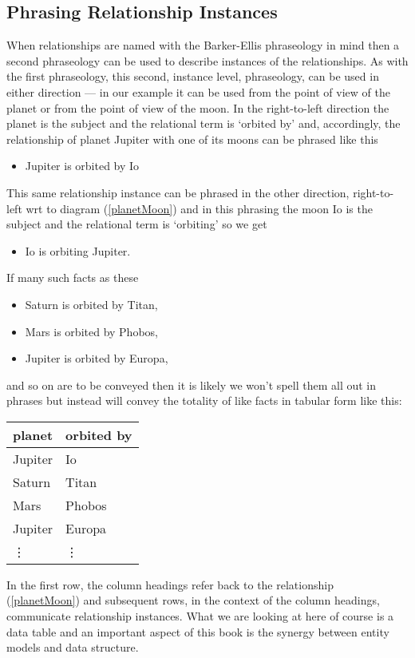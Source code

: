 \subsection{Phrasing Relationship Instances}
\mynote
When relationships are named with the 
Barker-Ellis phraseology in mind  then a second phraseology can be used to describe instances of the relationships. 
As with the first phraseology, this second, instance level, phraseology,
 can be used in either direction
 --- in our example it can be used from the point of view
of the planet or from the point of view of the moon.
In the right-to-left direction the planet is the subject and the relational term is
`orbited by' and, accordingly, the relationship of planet Jupiter with one of its moons can be phrased like this
\begin{itemize}
\renewcommand\labelitemi{--}
\item Jupiter is orbited by Io
\end{itemize}

This same relationship instance can be phrased in the other direction, right-to-left wrt to diagram (\ref{planetMoon}) and in this phrasing the moon Io is the subject and the relational term is `orbiting' so we get
\begin{itemize}
\renewcommand\labelitemi{--}
\item Io is orbiting  Jupiter.
\end{itemize}

If many such facts as these
\begin{itemize}
\renewcommand\labelitemi{--} 
\item Saturn is orbited by Titan, 
\item Mars is orbited by Phobos, 
\item Jupiter is orbited by Europa,
\end{itemize}
and so on  are to be conveyed then it is likely we won't spell them all out in phrases 
but instead  will convey the totality of like facts in tabular form like this:
\begin{center}
\begin{tabular}{|l | l|}
\hline
planet & orbited by \\
\hline\hline
Jupiter  & Io \\
\hline
Saturn   & Titan    \\
\hline
Mars     & Phobos    \\
\hline
Jupiter  & Europa         \\
\hline
\vdots    & \vdots  \\
\hline
\end{tabular}
\end{center}
In the first row, the column headings refer  back to the relationship (\ref{planetMoon})
and subsequent rows, in the context of the column headings, communicate relationship instances. 
What we are looking at here of course is a data table and an important aspect of this book 
is the synergy between  entity models and data structure.

